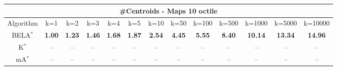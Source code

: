 \begin{tabular}{c|cccccccccccc}\toprule
\multicolumn{13}{c}{#Centroids - Maps 10 octile}\\ \midrule
Algorithm & k=1 & k=2 & k=3 & k=4 & k=5 & k=10 & k=50 & k=100 & k=500 & k=1000 & k=5000 & k=10000 \\ \midrule
BELA$^*$ & \textbf{1.00} & \textbf{1.23} & \textbf{1.46} & \textbf{1.68} & \textbf{1.87} & \textbf{2.54} & \textbf{4.45} & \textbf{5.55} & \textbf{8.40} & \textbf{10.14} & \textbf{13.34} & \textbf{14.96} \\
K$^*$ & -- & -- & -- & -- & -- & -- & -- & -- & -- & -- & -- & -- \\
mA$^*$ & -- & -- & -- & -- & -- & -- & -- & -- & -- & -- & -- & -- \\ \bottomrule 
\end{tabular}

